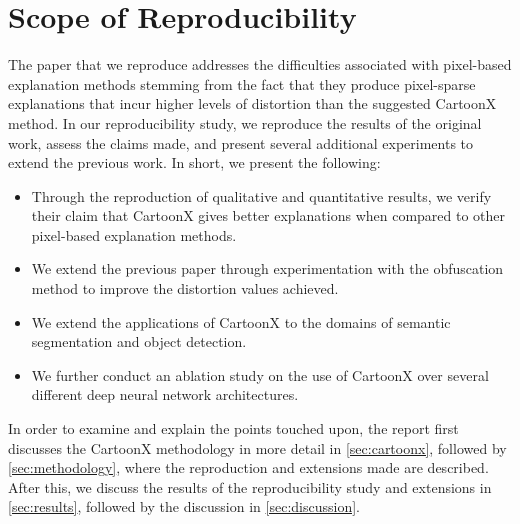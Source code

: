 \section{Scope of Reproducibility}
\label{sec:claims}
The paper that we reproduce addresses the difficulties associated with pixel-based explanation methods stemming from the fact that they produce pixel-sparse explanations that incur higher levels of distortion than the suggested CartoonX method. 
In our reproducibility study, we reproduce the results of the original work, assess the claims made, and present several additional experiments to extend the previous work. In short, we present the following:
\begin{itemize}
    \item Through the reproduction of qualitative and quantitative results, we verify their claim that  CartoonX gives better explanations when compared to other pixel-based explanation methods. 
    \item We extend the previous paper through experimentation with the obfuscation method to improve the distortion values achieved.
    \item We extend the applications of CartoonX to the domains of semantic segmentation and object detection.
    \item We further conduct an ablation study on the use of CartoonX over several different deep neural network architectures. 
\end{itemize}
In order to examine and explain the points touched upon, the report first discusses the CartoonX methodology in more detail in \autoref{sec:cartoonx}, followed by \autoref{sec:methodology}, where the reproduction and extensions made are described. After this, we discuss the results of the reproducibility study and extensions in \autoref{sec:results}, followed by the discussion in \autoref{sec:discussion}. 


